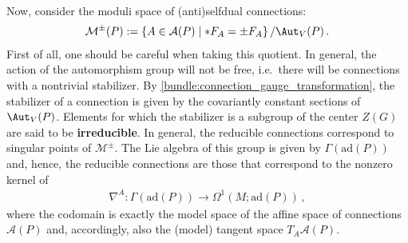     Now, consider the moduli space of (anti)selfdual connections:
    \begin{gather}
        \mathcal{M}^\pm(P) := \{A\in\mathcal{A}(P)\mid\ast F_A=\pm F_A\}\, / \Aut_V(P)\,.
    \end{gather}
    First of all, one should be careful when taking this quotient. In general, the action of the automorphism group will not be free, i.e.~there will be connections with a nontrivial stabilizer. By \cref{bundle:connection_gauge_transformation}, the stabilizer of a connection is given by the covariantly constant sections of $\Aut_V(P)$. Elements for which the stabilizer is a subgroup of the center $Z(G)$ are said to be \textbf{irreducible}. In general, the reducible connections correspond to singular points of $\mathcal{M}^\pm$. The Lie algebra of this group is given by $\Gamma(\mathrm{ad}(P))$ and, hence, the reducible connections are those that correspond to the nonzero kernel of
    \begin{gather}
        \nabla^A:\Gamma(\mathrm{ad}(P))\rightarrow\Omega^1(M;\mathrm{ad}(P))\,,
    \end{gather}
    where the codomain is exactly the model space of the affine space of connections $\mathcal{A}(P)$ and, accordingly, also the (model) tangent space $T_A\mathcal{A}(P)$.

